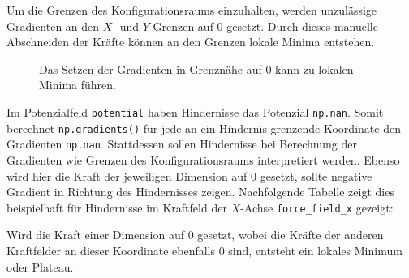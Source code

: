 Um die Grenzen des Konfigurationsraums einzuhalten, werden unzulässige Gradienten an den $X$- und $Y$-Grenzen auf $0$ gesetzt. Durch dieses manuelle Abschneiden der Kräfte können an den Grenzen lokale Minima entstehen.
\begin{figure}[h!]
	\centering
	\footnotesize
	\centerline{\resizebox{0.65\linewidth}{!}{}}
	\caption{Das Setzen der Gradienten in Grenznähe auf 0 kann zu lokalen Minima führen.}
\end{figure}
Im Potenzialfeld \texttt{potential} haben Hindernisse das Potenzial \texttt{np.nan}. Somit berechnet \texttt{np.gradients()} für jede an ein Hindernis grenzende Koordinate den Gradienten \texttt{np.nan}.
Stattdessen sollen Hindernisse bei Berechnung der Gradienten wie Grenzen des Konfigurationsraums interpretiert werden. Ebenso wird hier die Kraft der jeweiligen Dimension auf 0 gesetzt, sollte negative Gradient in Richtung des Hindernisses zeigen. Nachfolgende Tabelle zeigt dies beispielhaft für Hindernisse im Kraftfeld der $X$-Achse \texttt{force\_field\_x} gezeigt:
\begin{table}[H]
\centerline{}
\end{table}
Wird die Kraft einer Dimension auf $0$ gesetzt, wobei die Kräfte der anderen Kraftfelder an dieser Koordinate ebenfalls $0$ sind, entsteht ein lokales Minimum oder Plateau.

